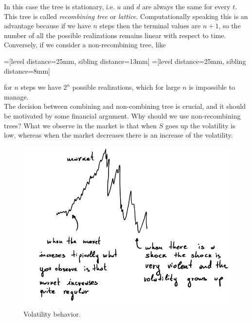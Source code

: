 In this case the tree is stationary, i.e. $u$ and $d$ are always the same for every $t$. This tree is called \emph{recombining tree} or \emph{lattice}. Computationally speaking this is an advantage because if we have $n$ steps then the terminal values are $n+1$, so the number of all the possible realizations remains linear with respect to time.\\
Conversely, if we consider a non-recombining tree, like
\begin{center}
=[level distance=25mm, sibling distance=13mm]
=[level distance=25mm, sibling distance=8mm]
\end{center}
for $n$ steps we have $2^n$ possible realizations, which for large $n$ is impossible to manage.\\
The decision between combining and non-combining tree is crucial, and it should be motivated by some financial argument. Why should we use non-recombining trees? What we observe in the market is that when $S$ goes up the volatility is low, whereas when the market decreases there is an increase of the volatility.
\begin{figure}[h]
    \centering
    \includegraphics[scale=0.2]{fig/tmp/fig6}
    \caption{Volatility behavior.}
    \label{fig:figura6}
\end{figure}
